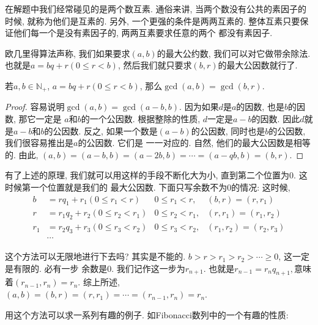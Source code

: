 在解题中我们经常碰见的是两个数互素. 通俗来讲, 当两个数没有公共的素因子的时候, 就称为他们是互素的. 
另外, 一个更强的条件是两两互素的. 整体互素只要保证他们每一个是没有素因子的, 两两互素要求任意的两个
都没有素因子. 

 欧几里得算法声称, 我们如果要求$(a,b)$的最大公约数, 我们可以对它做带余除法. 
也就是$a=bq+r(0\leq r<b)$, 然后我们就只要求$(b,r)$的最大公因数就行了. 

\begin{theorem}[Euclid算法原理]
    若$a,b\in \mathbb N_+$, $a=bq+r(0\leq r<b)$, 那么$\gcd(a,b) = \gcd(b, r)$. 
\end{theorem}

\begin{proof}
    容易说明$\gcd(a, b)=\gcd(a-b, b)$. 因为如果$d$是$a$的因数, 也是$b$的因数, 那它一定是
    $a$和$b$的一个公因数. 根据整除的性质, $d$一定是$a-b$的因数. 因此$d$就是$a-b$和$b$的公因数. 
    反之, 如果一个数是$(a-b)$的公因数, 同时也是$b$的公因数, 我们很容易推出是$a$的公因数. 它们是
    一一对应的. 自然, 他们的最大公因数是相等的. 由此, $(a,b)=(a-b, b)=(a-2b,b)=\cdots=(a-qb,b)=(b,r)$.
\end{proof}

有了上述的原理, 我们就可以用这样的手段不断化大为小, 直到第二个位置为$0$. 这时候第一个位置就是我们的
最大公因数. 下面只写余数不为0的情况: 这时候, 
\begin{align*}
    b&=rq_1+r_1(0\leq r_1<r) &  0\leq r_1 < r,  & (b, r) = (r, r_1) \\
    r&=r_1q_2+r_2(0\leq r_2<r_1) &  0\leq r_2 < r_1,  & (r, r_1) = (r_1, r_2) \\
    r_1&=r_2q_3+r_3(0\leq r_3<r_2) &  0\leq r_3 < r_2,  & (r_1, r_2) = (r_2, r_3) \\
    &\cdots
\end{align*}

这个方法可以无限地进行下去吗? 其实是不能的. $b>r>r_1>r_2>\cdots\geq0$, 这一定是有限的. 必有一步
余数是0. 我们记作这一步为$r_{n+1}$. 也就是$r_{n-1}=r_nq_{n+1}, $意味着$(r_{n-1}, r_n)=r_n$. 
综上所述, $(a,b)=(b, r)=(r, r_1)=\cdots = (r_{n-1}, r_n)=r_n$. 

用这个方法可以求一系列有趣的例子. 如Fibonacci数列中的一个有趣的性质: 

